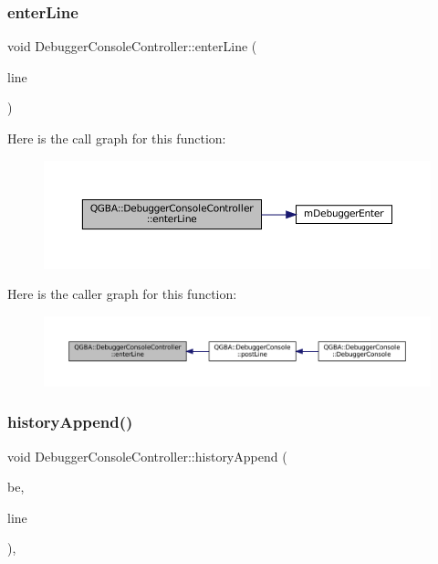 \subsubsection{\texorpdfstring{enter\+Line}{enterLine}}
{\footnotesize\ttfamily void Debugger\+Console\+Controller\+::enter\+Line (\begin{DoxyParamCaption}\item[{const Q\+String \&}]{line }\end{DoxyParamCaption})\hspace{0.3cm}{\ttfamily [slot]}}

Here is the call graph for this function\+:
\nopagebreak
\begin{figure}[H]
\begin{center}
\leavevmode
\includegraphics[width=350pt]{class_q_g_b_a_1_1_debugger_console_controller_ae81d1d614b8a97913a15d7cf685bc4da_cgraph}
\end{center}
\end{figure}
Here is the caller graph for this function\+:
\nopagebreak
\begin{figure}[H]
\begin{center}
\leavevmode
\includegraphics[width=350pt]{class_q_g_b_a_1_1_debugger_console_controller_ae81d1d614b8a97913a15d7cf685bc4da_icgraph}
\end{center}
\end{figure}
\mbox{\label{class_q_g_b_a_1_1_debugger_console_controller_a4db0f8c964e69b7fde4e5bc79f30353e}} 
\subsubsection{\texorpdfstring{history\+Append()}{historyAppend()}}
{\footnotesize\ttfamily void Debugger\+Console\+Controller\+::history\+Append (\begin{DoxyParamCaption}\item[{struct C\+L\+I\+Debugger\+Backend $\ast$}]{be,  }\item[{const char $\ast$}]{line }\end{DoxyParamCaption})\hspace{0.3cm}{\ttfamily [static]}, {\ttfamily [private]}}

